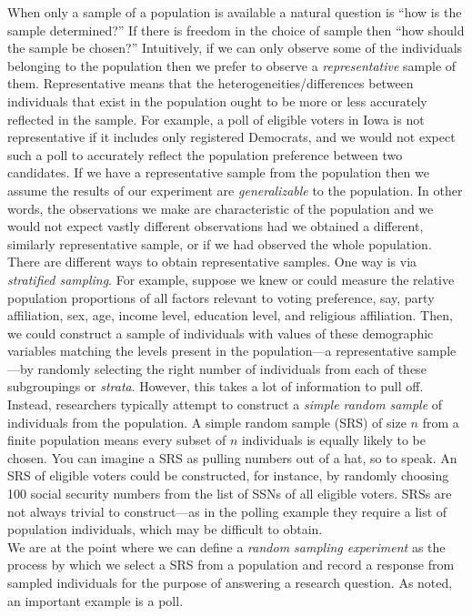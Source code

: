 \documentclass[]{book}
\begin{document}
When only a sample of a population is available a natural question is
``how is the sample determined?'' If there is freedom in the choice of
sample then ``how should the sample be chosen?'' Intuitively, if we can
only observe some of the individuals belonging to the population then we
prefer to observe a \emph{representative} sample of them. Representative
means that the heterogeneities/differences between individuals that
exist in the population ought to be more or less accurately reflected in
the sample. For example, a poll of eligible voters in Iowa is not
representative if it includes only registered Democrats, and we would
not expect such a poll to accurately reflect the population preference
between two candidates. If we have a representative sample from the
population then we assume the results of our experiment are
\emph{generalizable} to the population. In other words, the observations
we make are characteristic of the population and we would not expect
vastly different observations had we obtained a different, similarly
representative sample, or if we had observed the whole population. There
are different ways to obtain representative samples. One way is via
\emph{stratified sampling}. For example, suppose we knew or could
measure the relative population proportions of all factors relevant to
voting preference, say, party affiliation, sex, age, income level,
education level, and religious affiliation. Then, we could construct a
sample of individuals with values of these demographic variables
matching the levels present in the population---a representative
sample---by randomly selecting the right number of individuals from each
of these subgroupings or \emph{strata}. However, this takes a lot of
information to pull off. Instead, researchers typically attempt to
construct a \emph{simple random sample} of individuals from the
population. A simple random sample (SRS) of size \(n\) from a finite
population means every subset of \(n\) individuals is equally likely to
be chosen. You can imagine a SRS as pulling numbers out of a hat, so to
speak. An SRS of eligible voters could be constructed, for instance, by
randomly choosing 100 social security numbers from the list of SSNs of
all eligible voters. SRSs are not always trivial to construct---as in
the polling example they require a list of population individuals, which
may be difficult to obtain.\\

We are at the point where we can define a \emph{random sampling
experiment} as the process by which we select a SRS from a population
and record a response from sampled individuals for the purpose of
answering a research question. As noted, an important example is a poll.
\end{document}
